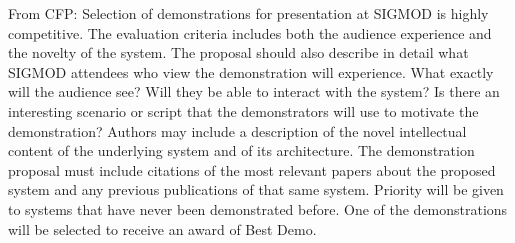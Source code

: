 From CFP: Selection of demonstrations for presentation at SIGMOD is highly
competitive. The evaluation criteria includes both the audience experience and
the novelty of the system. The proposal should also describe in detail what
SIGMOD attendees who view the demonstration will experience. What exactly will
the audience see? Will they be able to interact with the system? Is there an
interesting scenario or script that the demonstrators will use to motivate the
demonstration? Authors may include a description of the novel intellectual
content of the underlying system and of its architecture. The demonstration
proposal must include citations of the most relevant papers about the proposed
system and any previous publications of that same system. Priority will be
given to systems that have never been demonstrated before. One of the
demonstrations will be selected to receive an award of Best Demo.
